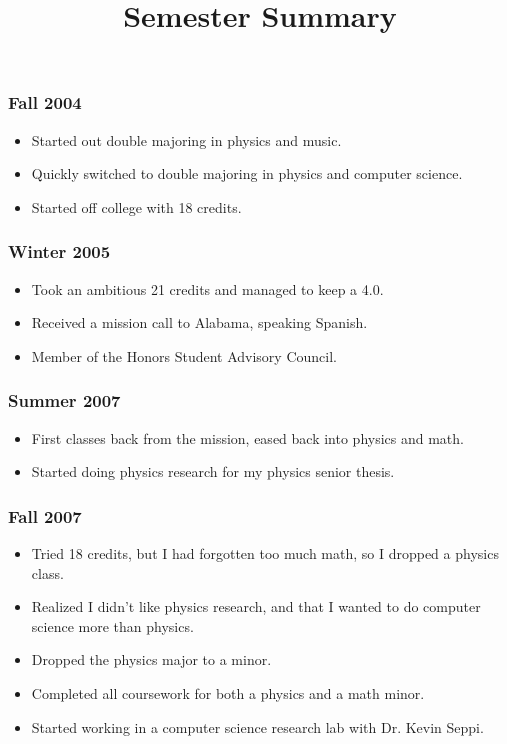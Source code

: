 \documentclass[onecolumn, 10pt]{article}
\title{Semester Summary}
\author{}
\date{}
\begin{document}
\maketitle

\subsubsection*{Fall 2004}
\begin{itemize}
  \item Started out double majoring in physics and music.
  \item Quickly switched to double majoring in physics and computer science.
  \item Started off college with 18 credits.
\end{itemize}
\subsubsection*{Winter 2005}
\begin{itemize}
  \item Took an ambitious 21 credits and managed to keep a 4.0.
  \item Received a mission call to Alabama, speaking Spanish.
  \item Member of the Honors Student Advisory Council.
\end{itemize}
\subsubsection*{Summer 2007}
\begin{itemize}
  \item First classes back from the mission, eased back into physics and math.
  \item Started doing physics research for my physics senior thesis.
\end{itemize}
\subsubsection*{Fall 2007}
\begin{itemize}
  \item Tried 18 credits, but I had forgotten too much math, so I dropped a 
	physics class.
  \item Realized I didn't like physics research, and that I wanted to do
	computer science more than physics.
  \item Dropped the physics major to a minor.
  \item Completed all coursework for both a physics and a math minor.
  \item Started working in a computer science research lab with Dr. Kevin Seppi.
\end{itemize}
\end{document}

